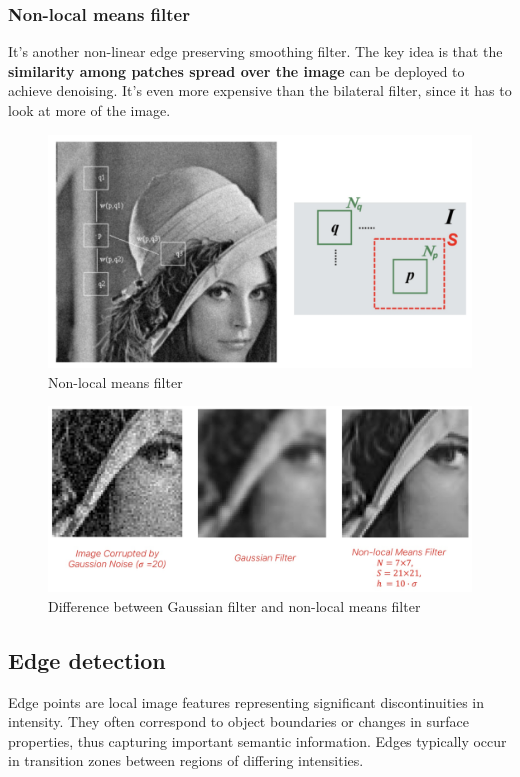 \subsubsection{Non-local means filter}

It's another non-linear edge preserving smoothing filter.
The key idea is that the \textbf{similarity among patches spread over the image} can be deployed to achieve denoising.
It's even more expensive than the bilateral filter, since it has to look at more of the image.

\begin{figure}[htbp]
  \centering
  \includegraphics[width=0.7\linewidth]{./img/nonlocalmeans_filter.jpg}
  \caption{Non-local means filter}
  \label{fig:nonlocalmeans_filter}
\end{figure}

\begin{figure}[htbp]
  \centering
  \includegraphics[width=0.7\linewidth]{./img/nonlocalmeans_comparison.jpg}
  \caption{Difference between Gaussian filter and non-local means filter}
  \label{fig:nonlocalmeans_comparison}
\end{figure}

\subsection{Edge detection}

Edge points are local image features representing significant discontinuities in intensity. They often correspond to object boundaries or changes in surface properties, thus capturing important semantic information. Edges typically occur in transition zones between regions of differing intensities.

